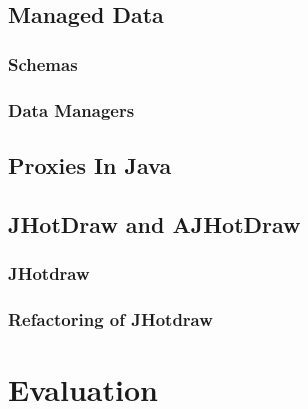 \documentclass{uvamscse}
\begin{document}
\section{Managed Data}\label{Managed Data}

\subsection{Schemas}\label{Schemas}

\subsection{Data Managers}\label{Data Managers}

\section{Proxies In Java}\label{Proxies In Java}

\section{JHotDraw and AJHotDraw}\label{JHotDraw and AJHotDraw}

\subsection{JHotdraw}\label{JHotdraw}

\subsection{Refactoring of JHotdraw}\label{Refactoring of JHotdraw}

\chapter{Evaluation}\label{Evaluation}
\end{document}

